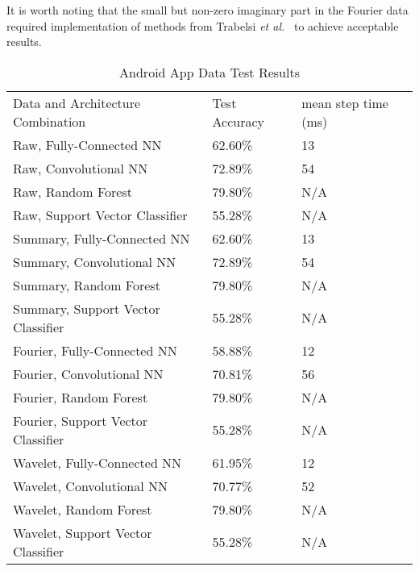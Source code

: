 \renewcommand{\thefootnote}{1}
It is worth noting that the small but non-zero imaginary part in the Fourier data required implementation of methods from Trabelsi \textit{et al.}~\cite{trabelsi2017deep} to achieve acceptable results.

\begin{table}[ht]
\caption{Android App Data Test Results}
\centering
\label{Tab:test}	
\begin{tabular}{lll}
Data and Architecture Combination & Test Accuracy & mean step time (ms) \\
Raw, Fully-Connected NN            & 62.60\%         & 13\\
Raw, Convolutional NN              & 72.89\%         & 54\\
Raw, Random Forest                 & 79.80\%         & N/A\\ 
Raw, Support Vector Classifier     & 55.28\%         & N/A\\    
Summary, Fully-Connected NN        & 62.60\%         & 13\\
Summary, Convolutional NN          & 72.89\%         & 54\\
Summary, Random Forest             & 79.80\%         & N/A\\
Summary, Support Vector Classifier & 55.28\%         & N/A\\  
Fourier, Fully-Connected NN        & 58.88\%         & 12\\
Fourier, Convolutional NN          & 70.81\%         & 56\\
Fourier, Random Forest             & 79.80\%         & N/A\\
Fourier, Support Vector Classifier & 55.28\%         & N/A\\  
Wavelet, Fully-Connected NN        & 61.95\%         & 12\\
Wavelet, Convolutional NN          & 70.77\%         & 52\\
Wavelet, Random Forest             & 79.80\%         & N/A\\
Wavelet, Support Vector Classifier & 55.28\%         & N/A           
\end{tabular}
\end{table}


